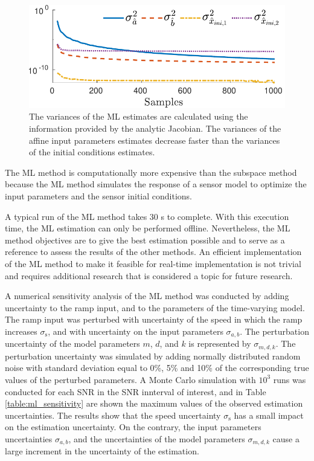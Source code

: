 \begin{figure}[!htbp]
\centering
\includegraphics[width=1\columnwidth]{./ChapterRampInput/fig/Fig_8.pdf} 
\caption{ \label{fig:cov_lo_40dB_s1} The variances of the ML estimates are calculated using the information provided by the analytic Jacobian. The variances of the affine input parameters estimates decrease faster than the variances of the initial conditions estimates.  }
\end{figure}

The ML method is  computationally more expensive than the subspace method because the ML method simulates the response of a sensor model to optimize the input parameters and the sensor initial conditions.

A typical run of the ML method takes 30 s to complete.
With this execution time, the ML estimation can only be performed offline.
Nevertheless, the ML method objectives are to give the best estimation possible and to serve as a reference to assess the results of the other methods.
An efficient implementation of the ML method to make it feasible for real-time implementation is not trivial and requires additional research that is considered a topic for future research.

A numerical sensitivity analysis of the ML method was conducted by adding uncertainty to the ramp input, and to the parameters of the time-varying model. 
The ramp input was perturbed with uncertainty of the speed in which the ramp increases $\sigma_{\mathrm{s}}$, and with uncertainty on the input parameters $\sigma_{a,b}$. 
The perturbation uncertainty of the model parameters $m$, $d$, and $k$ is represented by $\sigma_{m,d,k}$. 
The perturbation uncertainty was simulated by adding normally distributed random noise with standard deviation equal to 0\%, 5\% and 10\% of the corresponding true values of the perturbed parameters.
A Monte Carlo simulation with $10^3$ runs was conducted for each SNR in the SNR innterval of interest, and in Table \ref{table:ml_sensitivity} are shown the maximum values of the observed estimation uncertainties. 
The results show that the speed uncertainty $\sigma_{\mathrm{s}}$ has a small impact on the estimation uncertainty.
On the contrary, the input parameters uncertainties $\sigma_{a,b}$, and the uncertainties of the model parameters $\sigma_{m,d,k}$ cause a large increment in the uncertainty of the estimation.

